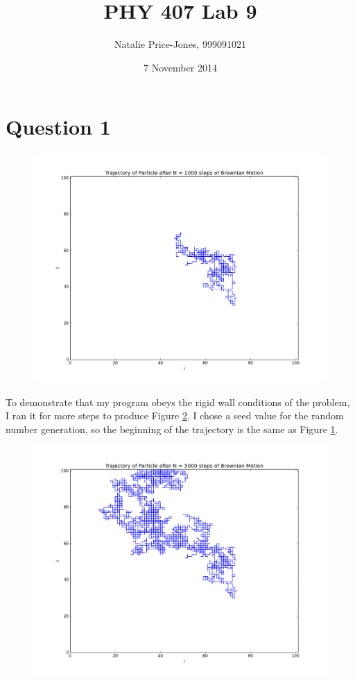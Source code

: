 \documentclass[a4paper,12pt]{article}
\begin{document}
\onehalfspacing
\title{PHY 407 Lab 9}
\author{Natalie Price-Jones, 999091021}
\date{7 November 2014}
\maketitle

\section{Question 1}

\begin{figure}[H]
\centering
\includegraphics[width = \linewidth]{lab10_q1.png}
\caption{}
\label{fig:q1}
\end{figure}

To demonstrate that my program obeys the rigid wall conditions of the problem, I ran it for more steps to produce Figure \ref{fig:q1aux}. I chose a seed value for the random number generation, so the beginning of the trajectory is the same as Figure \ref{fig:q1}.

\begin{figure}[H]
\centering
\includegraphics[width = \linewidth]{lab10_q1aux.png}
\caption{}
\label{fig:q1aux}
\end{figure}
\end{document}
